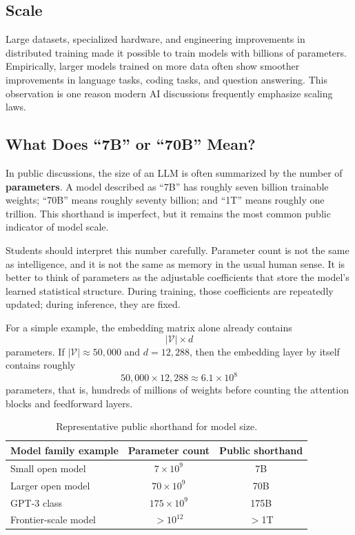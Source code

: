 \documentclass[12pt]{article}
\begin{document}
\subsection{Scale}

Large datasets, specialized hardware, and engineering improvements in distributed training made it possible to train models with billions of parameters. Empirically, larger models trained on more data often show smoother improvements in language tasks, coding tasks, and question answering. This observation is one reason modern AI discussions frequently emphasize scaling laws.

\subsection{What Does ``7B'' or ``70B'' Mean?}

In public discussions, the size of an LLM is often summarized by the number of \textbf{parameters}. A model described as ``7B'' has roughly seven billion trainable weights; ``70B'' means roughly seventy billion; and ``1T'' means roughly one trillion. This shorthand is imperfect, but it remains the most common public indicator of model scale.

Students should interpret this number carefully. Parameter count is not the same as intelligence, and it is not the same as memory in the usual human sense. It is better to think of parameters as the adjustable coefficients that store the model's learned statistical structure. During training, those coefficients are repeatedly updated; during inference, they are fixed.

For a simple example, the embedding matrix alone already contains
\begin{equation}
    |\mathcal{V}|\times d
    \label{t15eq:embedding_param_count}
\end{equation}
parameters. If $|\mathcal{V}|\approx 50{,}000$ and $d=12{,}288$, then the embedding layer by itself contains roughly
\[
    50{,}000\times 12{,}288 \approx 6.1\times 10^8
\]
parameters, that is, hundreds of millions of weights before counting the attention blocks and feedforward layers.

\begin{table}[ht]
    \centering
    \caption{Representative public shorthand for model size.}
    \label{t15tab:model_scale}
    \begin{tabular}{lcc}
        \toprule
        \textbf{Model family example} & \textbf{Parameter count} & \textbf{Public shorthand} \\
        \midrule
        Small open model & $7\times 10^9$ & 7B \\
        Larger open model & $70\times 10^9$ & 70B \\
        GPT-3 class & $175\times 10^9$ & 175B \\
        Frontier-scale model & $>10^{12}$ & $>$1T \\
        \bottomrule
    \end{tabular}
\end{table}
\end{document}
